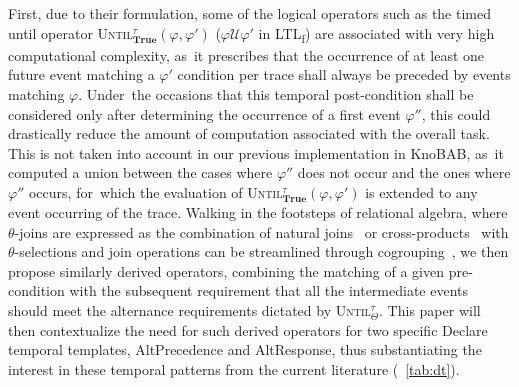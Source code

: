 \documentclass[information,article,accept,pdftex,oneauthor]{Definitions/mdpi}
\begin{document}
{First}, due to their formulation, some of the logical operators such as the timed until {operator} %
 \textsc{Until}$^\tau_\textbf{True}(\varphi,\varphi')$ ($\varphi \mathcal{U}\varphi'$ in LTL\textsubscript{f}) are associated with very high computational complexity, as~it prescribes that the occurrence of at least one future event matching a $\varphi'$ condition per trace shall always be preceded by events matching $\varphi$. Under~the occasions that this temporal post-condition shall be considered only after determining the occurrence of a first event  $\varphi''$, this could drastically reduce the amount of computation associated with the overall task. This is not taken into account in our previous implementation in KnoBAB, as~it computed a union between the cases where $\varphi''$ does not occur and the ones where $\varphi''$ occurs, for~which the evaluation of \textsc{Until}$^\tau_\textbf{True}(\varphi,\varphi')$ is extended to any event occurring of the trace. Walking in the footsteps of relational algebra, where $\theta$-joins are expressed as the combination of natural joins~\cite{DBLP:books/mg/AtzeniCPT99} or cross-products~\cite{10.5555/2842853} with $\theta$-selections and join operations can be streamlined through cogrouping~\cite{DBLP:books/x/dittrich2016}, we then propose similarly derived operators, combining the matching of a given pre-condition with the subsequent requirement that all the intermediate events should meet the alternance requirements dictated by \textsc{Until}$^\tau_\Theta$. This paper will then contextualize the need for such derived operators for two specific Declare temporal templates, \textsf{{AltPrecedence}} and \textsf{{AltResponse}}, thus substantiating the interest in these temporal patterns from the current literature (\tablename~\ref{tab:dt}).
\end{document}
